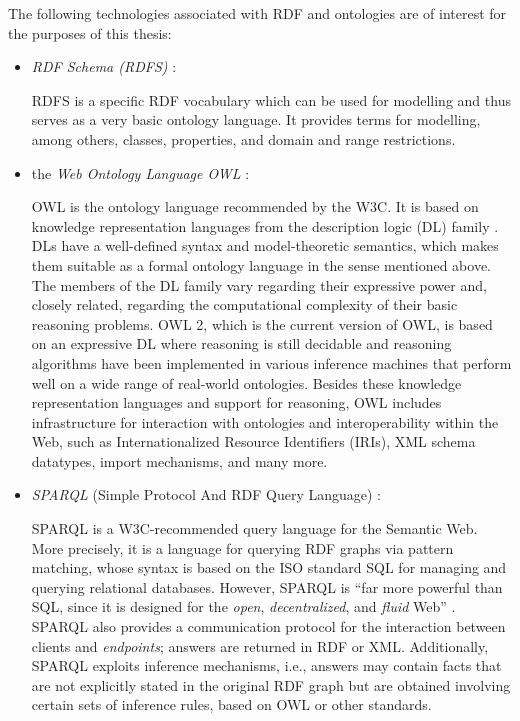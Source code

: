The following technologies associated with \gls{RDF} and ontologies
are of interest for the purposes of this thesis:
%
\begin{itemize}
  \item
    \emph{RDF Schema (RDFS)} \autocite{RDFS}:
    
    \par
    RDFS is a specific \gls{RDF} vocabulary which can be used for modelling
    and thus serves as a very basic ontology language.
    It provides terms for modelling, among others, classes, properties, and domain and range restrictions.
  \item
    the \emph{Web Ontology Language OWL} \autocite{OWLPrimer}:
    
    \par
    OWL is the ontology language recommended by the W3C.
    It is based on knowledge representation languages from the description logic (DL) family \autocite{Baader2017}.
    DLs have a well-defined syntax and model-theoretic semantics, which makes them suitable
    as a formal ontology language in the sense mentioned above.
    The members of the DL family vary regarding their expressive power and,
    closely related, regarding the computational complexity of their basic reasoning problems.
    OWL 2, which is the current version of OWL,
    is based on an expressive DL where reasoning is still decidable and reasoning algorithms have been implemented
    in various inference machines that perform well on a wide range of real-world ontologies.
    Besides these knowledge representation languages and support for reasoning,
    OWL includes infrastructure for interaction with ontologies and interoperability
    within the Web, such as Internationalized Resource Identifiers (IRIs),
    XML schema datatypes, import mechanisms, and many more.
  \item
    \emph{SPARQL} (Simple Protocol And RDF Query Language) \autocite{SPARQL}:
    
    \par
    SPARQL is a W3C-recommended query language for the Semantic Web.
    More precisely, it is a language for querying \gls{RDF} graphs via pattern matching,
    whose syntax is based on the ISO standard SQL \autocite{SQL} for managing and querying relational databases.
    However, SPARQL is \enquote{far more powerful than SQL, since it is designed for the \emph{open}, \emph{decentralized}, and \emph{fluid} Web} \autocite{DellaValle2011}.
    SPARQL also provides a communication protocol for the interaction between clients and \emph{endpoints};
    answers are returned in \gls{RDF} or XML.
    Additionally, SPARQL exploits inference mechanisms,
    i.e., answers may contain facts that are not explicitly stated in the original \gls{RDF} graph
    but are obtained involving certain sets of inference rules, based on OWL or other standards.
\end{itemize}

